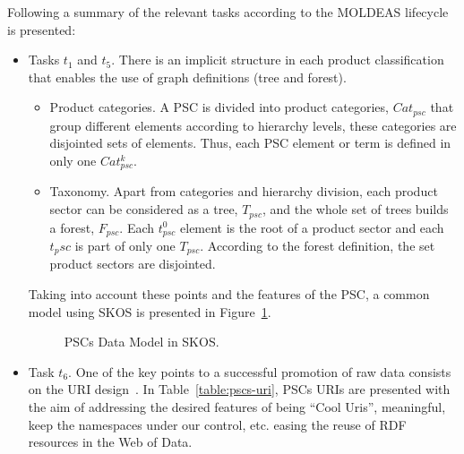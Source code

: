 Following a summary of the relevant tasks according to the MOLDEAS lifecycle is presented:
\begin{itemize}
 \item Tasks $t_1$ and $t_5$. There is an implicit structure in each product classification 
 that enables the use of graph definitions (tree and forest).
 \begin{itemize}
  \item Product categories. A PSC is divided into product categories, $Cat_{psc}$ 
  that group different elements according to hierarchy levels, these categories are disjointed sets of elements. 
  Thus, each PSC element or term is defined in only one $Cat^k_{psc}$.
  \item Taxonomy. Apart from categories and hierarchy division, each product sector can be considered as a tree, $T_{psc}$, 
  and the whole set of trees builds a forest, $F_{psc}$. Each $t^0_{psc}$  element 
  is the root of a product sector and each $t_psc$ is part of only one $T_{psc}$. According to the forest definition, 
  the set product sectors are disjointed.
 \end{itemize}

 Taking into account these points and the features of the PSC, a common model using SKOS is presented in Figure~\ref{fig:pscs-data-model}.
 
 \begin{figure}[ht]
\centering
 \caption{PSCs Data Model in SKOS.}
 \label{fig:pscs-data-model}
\end{figure}

\item Task $t_6$. One of the key points to a successful promotion of raw data consists on the URI 
design~\cite{Heath_Bizer_2011}. In Table~\ref{table:pscs-uri}, PSCs URIs are presented with the aim of addressing the desired features 
of being ``Cool Uris'', meaningful, keep the namespaces under our control, etc. 
easing the reuse of RDF resources in the Web of Data.
 

\end{itemize}
